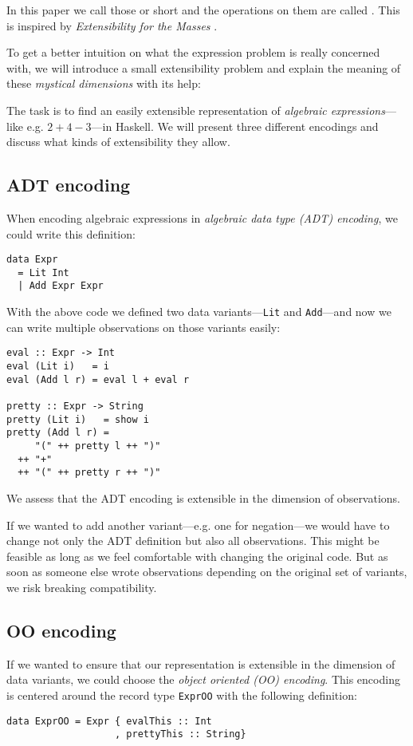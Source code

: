 In this paper we call those   or short
 and the operations on them are called . This is
inspired by \emph{Extensibility for the Masses} \cite{object_algebra}.

To get a better intuition on what the expression problem is really concerned
with, we will introduce a small extensibility problem and explain the meaning of
these \emph{mystical dimensions} with its help:

The task is to find an easily extensible representation of \emph{algebraic
  expressions}—like e.g. $2+4-3$—in Haskell. We will present three different
encodings and discuss what kinds of extensibility they allow.

\subsection{ADT encoding}

When encoding algebraic expressions in \emph{algebraic data type (ADT)
  encoding}, we could write this definition:

\begin{lstlisting}
data Expr
  = Lit Int
  | Add Expr Expr
\end{lstlisting}

With the above code we defined two data variants—\texttt{Lit} and
\texttt{Add}—and now we can write multiple observations on those variants
easily:

\begin{lstlisting} 
eval :: Expr -> Int
eval (Lit i)   = i
eval (Add l r) = eval l + eval r

pretty :: Expr -> String
pretty (Lit i)   = show i
pretty (Add l r) =
     "(" ++ pretty l ++ ")"
  ++ "+"
  ++ "(" ++ pretty r ++ ")"
\end{lstlisting}

We assess that the ADT encoding is extensible in the dimension of observations.

If we wanted to add another variant—e.g. one for negation—we would have to
change not only the ADT definition but also all observations. This might be
feasible as long as we feel comfortable with changing the original code. But as
soon as someone else wrote observations depending on the original set of
variants, we risk breaking compatibility.

\subsection{OO encoding}
If we wanted to ensure that our representation is extensible in the dimension of
data variants, we could choose the \emph{object oriented (OO) encoding}. This
encoding is centered around the record type \texttt{ExprOO} with the following
definition:
\begin{lstlisting}
data ExprOO = Expr { evalThis :: Int
                   , prettyThis :: String}
\end{lstlisting}

